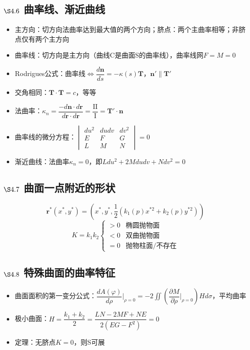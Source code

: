 \documentclass{article}
\begin{document}
	\subsection{$\S4.6$ 曲率线、渐近曲线}
	\begin{itemize}
		\item 主方向：切方向法曲率达到最大值的两个方向；脐点：两个主曲率相等；非脐点仅有两个主方向
		\item 曲率线：切方向是主方向（曲线C是曲面S的曲率线），曲率线网$F=M=0$
		\item Rodrigues公式：曲率线$\iff\dfrac{d\boldsymbol{n}}{ds}=-\kappa(s)\boldsymbol{T}$，$\boldsymbol{n}'\parallel\boldsymbol{T}'$
		\item 交角相同：$\boldsymbol{T}\cdot\boldsymbol{T}=c$，等等
		\item 法曲率：$\kappa_n=\dfrac{-d\boldsymbol{n}\cdot d\boldsymbol{r}}{d\boldsymbol{r}\cdot d\boldsymbol{r}}=\dfrac{\mathrm{II}}{\mathrm{I}}=\boldsymbol{T}'\cdot\boldsymbol{n}$
		\item 曲率线的微分方程：$\begin{vmatrix}du^2&dudv&dv^2\\E&F&G\\L&M&N\end{vmatrix}=0$
		\item 渐近曲线：法曲率$\kappa_n=0$，即$Ldu^2+2Mdudv+Ndv^2=0$
	\end{itemize}
	
	\subsection{$\S4.7$ 曲面一点附近的形状}
	\[
	\boldsymbol{r}^*(x^*,y^*)=\left(x^*,y^*,\dfrac{1}{2}(k_1(p)x^{*2}+k_2(p)y^{*2})\right)
	\]
	\[
	K=k_1k_2\begin{cases}>0&\text{椭圆抛物面}\\<0&\text{双曲抛物面}\\=0&\text{抛物柱面/不存在}\end{cases}
	\]
	
	\subsection{$\S4.8$ 特殊曲面的曲率特征}
	\begin{itemize}
		\item 曲面面积的第一变分公式：$\dfrac{dA(\varphi)}{d\rho}\bigg|_{\rho=0}=-2\iint\left(\dfrac{\partial M}{\partial\rho}\bigg|_{\rho=0}\right)Hd\sigma$，平均曲率
		\item 极小曲面：$H=\dfrac{k_1+k_2}{2}=\dfrac{LN-2MF+NE}{2(EG-F^2)}=0$
		\item 定理：无脐点$K=0$，则S可展
	\end{itemize}
	
\end{document}
